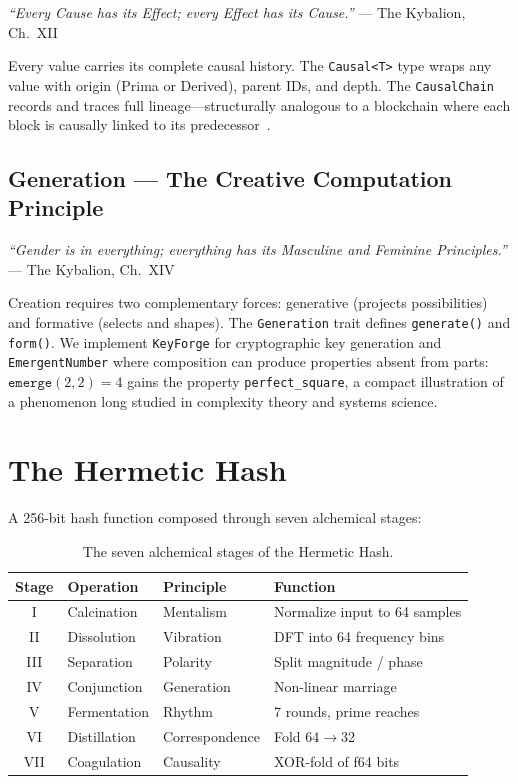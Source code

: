 \documentclass[sigplan,anonymous=false]{acmart}
\begin{document}
\emph{``Every Cause has its Effect; every Effect has its Cause.''} --- The Kybalion, Ch.~XII

Every value carries its complete causal history. The \texttt{Causal<T>} type wraps any value with origin (Prima or Derived), parent IDs, and depth. The \texttt{CausalChain} records and traces full lineage---structurally analogous to a blockchain where each block is causally linked to its predecessor~\cite{nakamoto}.

\subsection{Generation --- The Creative Computation Principle}

\emph{``Gender is in everything; everything has its Masculine and Feminine Principles.''} --- The Kybalion, Ch.~XIV

Creation requires two complementary forces: generative (projects possibilities) and formative (selects and shapes). The \texttt{Generation} trait defines \texttt{generate()} and \texttt{form()}. We implement \texttt{KeyForge} for cryptographic key generation and \texttt{EmergentNumber} where composition can produce properties absent from parts: $\texttt{emerge}(2, 2) = 4$ gains the property \texttt{perfect\_square}, a compact illustration of a phenomenon long studied in complexity theory and systems science.

\section{The Hermetic Hash}

A 256-bit hash function composed through seven alchemical stages:

\begin{table}[t]
\centering
\begin{tabular}{@{}clll@{}}
\toprule
\textbf{Stage} & \textbf{Operation} & \textbf{Principle} & \textbf{Function} \\
\midrule
I   & Calcination  & Mentalism       & Normalize input to 64 samples \\
II  & Dissolution  & Vibration       & DFT into 64 frequency bins \\
III & Separation   & Polarity        & Split magnitude / phase \\
IV  & Conjunction  & Generation      & Non-linear marriage \\
V   & Fermentation & Rhythm          & 7 rounds, prime reaches \\
VI  & Distillation & Correspondence  & Fold 64$\to$32 \\
VII & Coagulation  & Causality       & XOR-fold of f64 bits \\
\bottomrule
\end{tabular}
\caption{The seven alchemical stages of the Hermetic Hash.}
\label{tab:hash-stages}
\end{table}
\end{document}
